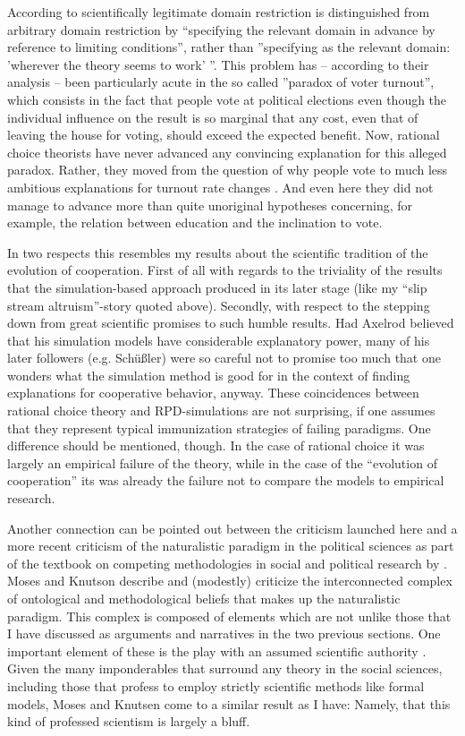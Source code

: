 \documentclass[graybox, English]{svmult}
\begin{document}
According to \citet[45]{green-shapiro:1994} scientifically legitimate
domain restriction is distinguished from arbitrary domain restriction
by ``specifying the relevant domain in advance by reference to
limiting conditions'', rather than ''specifying as the relevant
domain: 'wherever the theory seems to work' ''. This problem has --
according to their analysis -- been particularly acute in the so
called ''paradox of voter turnout'', which consists in the fact that
people vote at political elections even though the individual
influence on the result is so marginal that any cost, even that of
leaving the house for voting, should exceed the expected benefit. Now,
rational choice theorists have never advanced any convincing
explanation for this alleged paradox. Rather, they moved from the
question of why people vote to much less ambitious explanations for
turnout rate changes \citep[59]{green-shapiro:1994}. And even here
they did not manage to advance more than quite unoriginal hypotheses
concerning, for example, the relation between education and the
inclination to vote.

In two respects this resembles my results about the scientific
tradition of the evolution of cooperation. First of all with regards
to the triviality of the results that the simulation-based approach
produced in its later stage (like my ``slip stream
altruism''-story quoted above). Secondly, with respect to the stepping
down from great scientific promises to such humble results. Had
Axelrod believed that his simulation models have considerable
explanatory power, many of his later followers (e.g. Schüßler) were so
careful not to promise too much that one wonders what the simulation
method is good for in the context of finding explanations for
cooperative behavior, anyway. These coincidences between rational
choice theory and RPD-simulations are not surprising, if one assumes
that they represent typical immunization strategies of failing
paradigms. One difference should be mentioned, though. In the case of
rational choice it was largely an empirical failure of the theory,
while in the case of the ``evolution of cooperation'' its was already
the failure not to compare the models to empirical research.

Another connection can be pointed out between the criticism launched
here and a more recent criticism of the naturalistic paradigm in the
political sciences as part of the textbook on competing methodologies
in social and political research by
\citet[145-168]{moses-knutsen:2012}. Moses and Knutson describe and
(modestly) criticize the interconnected complex of ontological and
methodological beliefs that makes up the naturalistic paradigm. This
complex is composed of elements which are not unlike those that I have
discussed as arguments and narratives in the two previous
sections. One important element of these is the play with an assumed
scientific authority \citep[157ff.]{moses-knutsen:2012}. Given
the many imponderables that surround any theory in the social
sciences, including those that profess to employ strictly scientific
methods like formal models, Moses and Knutsen come 
to a similar result as I have:
Namely, that this kind of professed scientism is largely a bluff.


%
%


\end{document}
